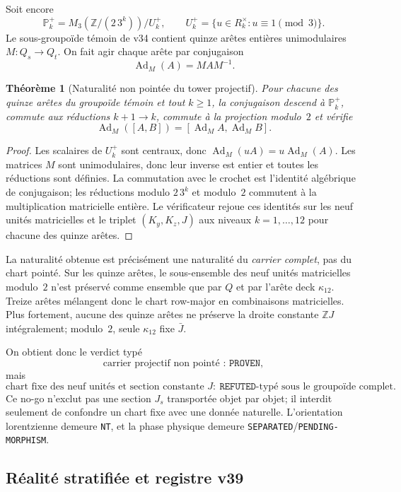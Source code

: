 \documentclass[11pt,a4paper]{article}
\newtheorem{theorem}{Théorème}[section]
\newcommand{\certProven}{\texttt{PROVEN}}
\newcommand{\certRefuted}{\texttt{REFUTED}}
\newcommand{\certSeparated}{\texttt{SEPARATED}}
\newcommand{\certPending}{\texttt{PENDING-MORPHISM}}
\newcommand{\certNT}{\texttt{NT}}
\begin{document}
Soit encore
\[
 \mathbb P_k^+=M_3(\mathbb Z/(2\,3^k))/U_k^+,
 \qquad
 U_k^+=\{u\in R_k^\times:u\equiv1\pmod3\}.
\]
Le sous-groupoïde témoin de v34 contient quinze arêtes entières unimodulaires $M:Q_s\to Q_t$. On fait agir chaque arête par conjugaison
\[
 \operatorname{Ad}_M(A)=MAM^{-1}.
\]

\begin{theorem}[Naturalité non pointée du tower projectif]\label{thm:v39-projective-groupoid}
Pour chacune des quinze arêtes du groupoïde témoin et tout $k\ge1$, la conjugaison descend à $\mathbb P_k^+$, commute aux réductions $k+1\to k$, commute à la projection modulo~$2$ et vérifie
\[
 \operatorname{Ad}_M([A,B])=[\operatorname{Ad}_M A,\operatorname{Ad}_M B].
\]
\end{theorem}
\begin{proof}
Les scalaires de $U_k^+$ sont centraux, donc $\operatorname{Ad}_M(uA)=u\operatorname{Ad}_M(A)$. Les matrices $M$ sont unimodulaires, donc leur inverse est entier et toutes les réductions sont définies. La commutation avec le crochet est l'identité algébrique de conjugaison; les réductions modulo $2\,3^k$ et modulo~$2$ commutent à la multiplication matricielle entière. Le vérificateur rejoue ces identités sur les neuf unités matricielles et le triplet $(K_y,K_z,J)$ aux niveaux $k=1,\ldots,12$ pour chacune des quinze arêtes.
\end{proof}

La naturalité obtenue est précisément une naturalité du \emph{carrier complet}, pas du chart pointé. Sur les quinze arêtes, le sous-ensemble des neuf unités matricielles modulo~$2$ n'est préservé comme ensemble que par $Q$ et par l'arête deck $\kappa_{12}$. Treize arêtes mélangent donc le chart row-major en combinaisons matricielles. Plus fortement, aucune des quinze arêtes ne préserve la droite constante $\mathbb ZJ$ intégralement; modulo~$2$, seule $\kappa_{12}$ fixe $\bar J$.

On obtient donc le verdict typé
\[
 \boxed{\text{carrier projectif non pointé : }\certProven,}
\]
mais
\[
 \boxed{\text{chart fixe des neuf unités et section constante }J:\ \certRefuted\text{-typé sous le groupoïde complet}.}
\]
Ce no-go n'exclut pas une section $J_s$ transportée objet par objet; il interdit seulement de confondre un chart fixe avec une donnée naturelle. L'orientation lorentzienne demeure \certNT{}, et la phase physique demeure \certSeparated{}/\certPending{}.

\subsection{Réalité stratifiée et registre v39}
\end{document}
